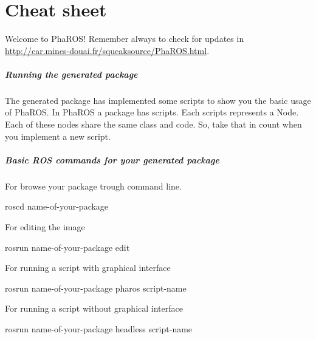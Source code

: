 \documentclass[a4paper,10pt,twoside]{book}
\begin{document}
\fi
\sloppy
\chapter{\pharos Cheat sheet}
	
	Welcome to PhaROS! \newline
	Remember always to check for updates in \url{http://car.mines-douai.fr/squeaksource/PhaROS.html}. 	 \newline

	\paragraph{Running the generated package \newline}
	
	The generated package has implemented some scripts to show you the basic usage of PhaROS. In PhaROS a package has scripts. Each scripts represents a Node. Each of these nodes share the same class and code. So, take that in count when you implement a new script. 
	
	\paragraph{Basic ROS commands for your generated package \newline}
	
	
	
	For browse your package trough command line. \newline
	
		roscd name-of-your-package \newline 
	
	For editing the image \newline
	
		rosrun name-of-your-package edit  \newline
		
	For running a script with graphical interface  \newline
	
		rosrun name-of-your-package pharos script-name  \newline
	
	 For running a script without graphical interface  \newline
	
		rosrun name-of-your-package headless script-name  \newline
	
\end{document}
